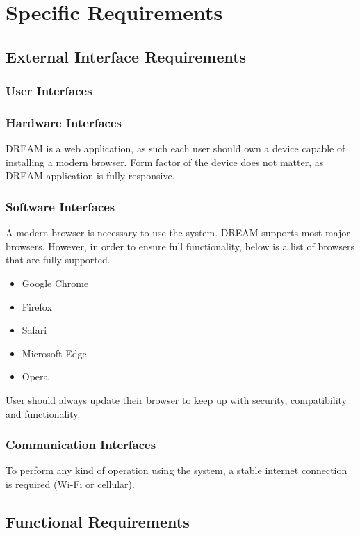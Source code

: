 \chapter{Specific Requirements}

\section{External Interface Requirements}

\subsection{User Interfaces}

\subsection{Hardware Interfaces}
DREAM is a web application, as such each user should own a device capable of installing a modern browser. Form factor of the device does not matter, as DREAM application is fully responsive.

\subsection{Software Interfaces}
A modern browser is necessary to use the system. DREAM supports most major browsers. However, in order to ensure full functionality, below is a list of browsers that are fully supported.
\begin{itemize}
    \setlength\itemsep{0em}
    \item Google Chrome
    \item Firefox
    \item Safari
    \item Microsoft Edge
    \item Opera
\end{itemize}
User should always update their browser to keep up with security, compatibility and functionality.

\subsection{Communication Interfaces}
To perform any kind of operation using the system, a stable internet connection is required (Wi-Fi or cellular).

\section{Functional Requirements}

